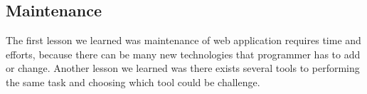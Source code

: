 \subsection{Maintenance}

The first lesson we learned was maintenance of web application requires time and efforts, because there can be many new technologies that programmer has to add or change. 
Another lesson we learned was there exists several tools to performing the same task and choosing which tool could be challenge. 



